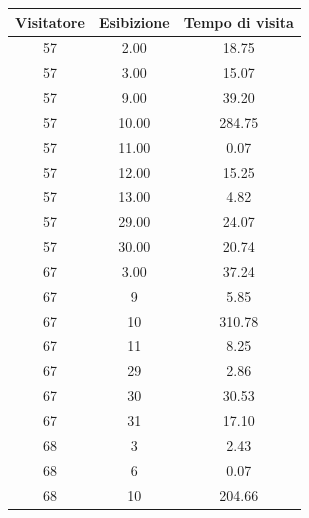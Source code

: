 \documentclass[12pt]{article}
\begin{document}
    \begin{table}[!ht]
        \centering
        \begin{tabular}{|c|c|c|}
        \hline
        \textbf{Visitatore} & \textbf{Esibizione} & \textbf{Tempo di visita} \\ \hline
        57                  & 2.00                & 18.75                    \\ \hline
        57                  & 3.00                & 15.07                    \\ \hline
        57                  & 9.00                & 39.20                    \\ \hline
        57                  & 10.00               & 284.75                   \\ \hline
        57                  & 11.00               & 0.07                     \\ \hline
        57                  & 12.00               & 15.25                    \\ \hline
        57                  & 13.00               & 4.82                     \\ \hline
        57                  & 29.00               & 24.07                    \\ \hline
        57                  & 30.00               & 20.74                    \\ \hline
        67                  & 3.00                & 37.24                    \\ \hline
        67                  & 9                   & 5.85                     \\ \hline
        67                  & 10                  & 310.78                   \\ \hline
        67                  & 11                  & 8.25                     \\ \hline
        67                  & 29                  & 2.86                     \\ \hline
        67                  & 30                  & 30.53                    \\ \hline
        67                  & 31                  & 17.10                    \\ \hline
        68                  & 3                   & 2.43                     \\ \hline
        68                  & 6                   & 0.07                     \\ \hline
        68                  & 10                  & 204.66                   \\ \hline

\end{tabular}
\end{table}
\end{document}
